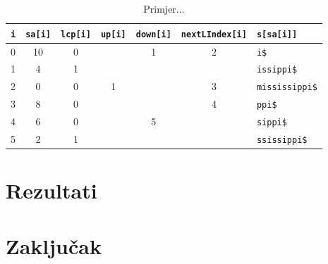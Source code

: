 \documentclass[times, utf8, seminar, numeric]{fer}
\begin{document}
\begin{table}[h]
	\centering
	\caption{Primjer...}
	\label{tbl:example}
	
	\begin{tabular}{ccccccl}
		\hline
    \texttt{i} & \texttt{sa[i]} & \texttt{lcp[i]} & \texttt{up[i]} & \texttt{down[i]} & \texttt{nextLIndex[i]} & \texttt{s[sa[i]]} \\ \hline
    0 & 10 &  0 &    &  1 &  2 & \texttt{i\$}           \\
    1 &  4 &  1 &    &    &    & \texttt{issippi\$}     \\
    2 &  0 &  0 &  1 &    &  3 & \texttt{mississippi\$} \\
    3 &  8 &  0 &    &    &  4 & \texttt{ppi\$}         \\
    4 &  6 &  0 &    &  5 &    & \texttt{sippi\$}       \\
    5 &  2 &  1 &    &    &    & \texttt{ssissippi\$}   \\ \hline
	\end{tabular}
\end{table}

\chapter{Rezultati}

\chapter{Zaključak}




\begin{sazetak}


\end{sazetak}
\end{document}
